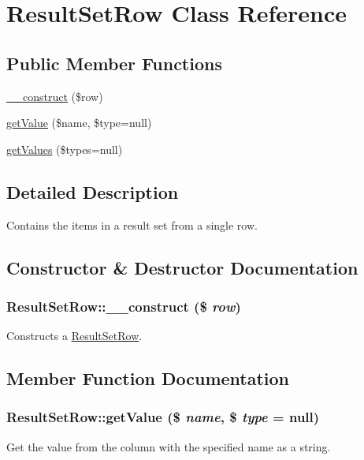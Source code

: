 \hypertarget{classResultSetRow}{
\section{ResultSetRow Class Reference}
\label{classResultSetRow}
}
\subsection*{Public Member Functions}
\begin{DoxyCompactItemize}
\item 
\hyperlink{classResultSetRow_a3f897baaa5a30d81cf11516ae0be04b7}{\_\-\_\-construct} (\$row)
\item 
\hyperlink{classResultSetRow_a7e96dad5900e697caeac3456604ed28f}{getValue} (\$name, \$type=null)
\item 
\hyperlink{classResultSetRow_aee1015a9b3975eab92106353dd2bae58}{getValues} (\$types=null)
\end{DoxyCompactItemize}


\subsection{Detailed Description}
Contains the items in a result set from a single row. 

\subsection{Constructor \& Destructor Documentation}
\hypertarget{classResultSetRow_a3f897baaa5a30d81cf11516ae0be04b7}{
\subsubsection[{\_\-\_\-construct}]{\setlength{\rightskip}{0pt plus 5cm}ResultSetRow::\_\-\_\-construct (\$ {\em row})}}
\label{classResultSetRow_a3f897baaa5a30d81cf11516ae0be04b7}
Constructs a \hyperlink{classResultSetRow}{ResultSetRow}. 

\subsection{Member Function Documentation}
\hypertarget{classResultSetRow_a7e96dad5900e697caeac3456604ed28f}{
\subsubsection[{getValue}]{\setlength{\rightskip}{0pt plus 5cm}ResultSetRow::getValue (\$ {\em name}, \/  \$ {\em type} = {\ttfamily null})}}
\label{classResultSetRow_a7e96dad5900e697caeac3456604ed28f}
Get the value from the column with the specified name as a string.


